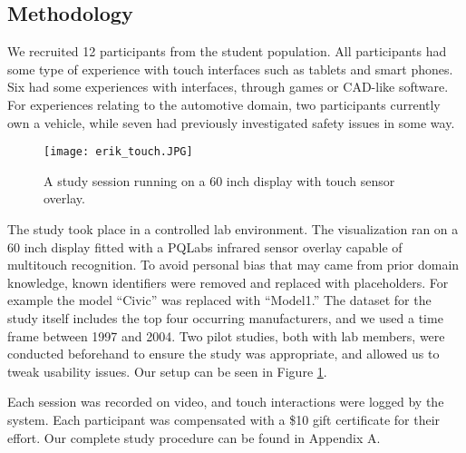 


\subsection{Methodology}
We recruited 12 participants from the student population. All participants had some
type of experience with touch interfaces such as tablets and smart phones. Six 
had some experiences with \threed interfaces, through games or CAD-like
software. For experiences relating to the automotive domain, two participants
currently own a vehicle, while seven had previously investigated safety issues in
some way. 
 
	\begin{figure}
	 \centering  
	 \texttt{[image: erik\_touch.JPG]}  
	 \caption[Study Setup.]{A study session running on a 60 inch display with touch sensor overlay.}
	 \label{figure:study}
	\end{figure} 


The study took place in a controlled lab environment. The visualization ran on
a 60 inch display fitted with a PQLabs infrared sensor overlay capable of
multitouch recognition. To avoid personal bias that may came from prior domain
knowledge, known identifiers were removed and replaced with placeholders.
For example the model ``Civic'' was replaced with ``Model1.'' The dataset for
the study itself includes the top four occurring manufacturers, and we used a time
frame between 1997 and 2004. Two pilot studies, both with lab members, were
conducted beforehand to ensure the study was appropriate, and allowed us to
tweak usability issues. Our setup can be seen in Figure \ref{figure:study}.

Each session was recorded on video, and touch interactions were
logged by the system. Each participant was compensated with a \$10 gift
certificate for their effort. Our complete study procedure can be found in Appendix A.



